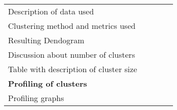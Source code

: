 \begin{table}[H]
\begin{tabular}{@{}l|c|c|c|c@{}}
Description of data used                        &    &    & \X &\x  \\
Clustering method and metrics used              & \X &\x  &    &    \\
Resulting Dendogram                             &\X  &    &\x  &\x  \\
Discussion about number of clusters             &    &\X  &    &    \\
Table with description of cluster size          &\x  &    &\X  &    \\ \midrule
\textbf{Profiling of clusters}                  &    &    &    &    \\
Profiling graphs                                &\x  &    &    &\X  \\
\end{tabular}
\end{table}
